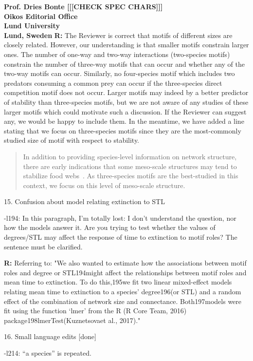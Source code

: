\documentclass[12pt]{letter}
\begin{document}
\begin{letter}{\bf Prof. Dries Bonte [[[CHECK SPEC CHARS]]]\\
Oikos Editorial Office \\
Lund University \\
Lund, Sweden}
      \textbf{R:} The Reviewer is correct that motifs of different sizes are closely related. However, our understanding is that smaller motifs constrain larger ones. The number of one-way and two-way interactions (two-species motifs) constrain the number of three-way motifs that can occur and whether any of the two-way motifs can occur. Similarly, no four-species motif which includes two predators consuming a common prey can occur if the three-species direct competition motif does not occur. Larger motifs may indeed by a better predictor of stability than three-species motifs, but we are not aware of any studies of these larger motifs which could motivate such a discussion. If the Reviewer can suggest any, we would be happy to include them. In the meantime, we have added a line stating that we focus on three-species motifs since they are the most-commonly studied size of motif with respect to stability.


      \begin{quotation}
          In addition to providing species-level information on network structure, there are early indications that some meso-scale structures may tend to stabilize food webs~\citep{Prill2005,Borrelli2015,Monteiro2016}. 
          As three-species motifs are the best-studied in this context, we focus on this level of meso-scale structure.
      \end{quotation}



    15. Confusion about model relating extinction to STL

      -l194: In this paragraph, I’m totally lost: I don’t understand the question, nor how the models answer it. Are you trying to test whether the values of degrees/STL may affect the response of time to extinction to motif roles? The sentence must be clarified.

      \textbf{R:}
      Referring to: "We also wanted to estimate how the associations between motif roles and degree or STL194might affect the relationships between motif roles and mean time to extinction. To do this,195we fit two linear mixed-effect models relating mean time to extinction to a species’ degree196(or STL) and a random effect of the combination of network size and connectance. Both197models were fit using the function ‘lmer’ from the R (R Core Team, 2016) package198lmerTest(Kuznetsovaet al., 2017)."


    16. Small language edits [done]

      -l214: “a species” is repeated.


\end{letter}
\end{document}
